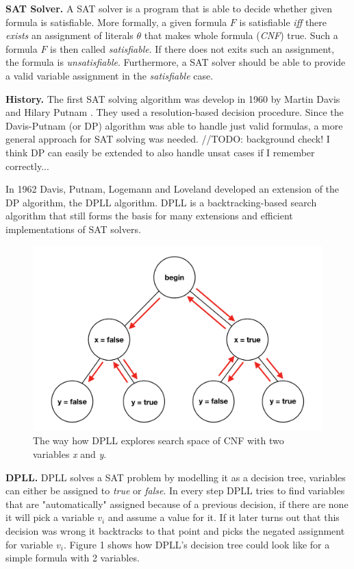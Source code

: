\documentclass[letterpaper]{article}
\newcommand{\mypar}[1]{{\bf #1.}}
\begin{document}

\mypar{SAT Solver}
A SAT solver is a program that is able to decide whether given formula is satisfiable.
More formally, a given formula $F$ is satisfiable \textit{iff} there \textit{exists} an assignment of literals $\theta$ that makes whole formula (\textit{CNF}) true.
Such a formula $F$ is then called \textit{satisfiable}.
If there does not exits such an assignment, the formula is \textit{unsatisfiable}.
Furthermore, a SAT solver should be able to provide a valid variable assignment in the \textit{satisfiable} case.

\mypar{History}
The first SAT solving algorithm was develop in 1960 by Martin Davis and Hilary Putnam \cite{dp}.
They used a resolution-based decision procedure.
Since the Davis-Putnam (or DP) algorithm was able to handle just valid formulas, a more general approach for SAT solving was needed.
//TODO: background check! I think DP can easily be extended to also handle unsat cases if I remember correctly...

In 1962 Davis, Putnam, Logemann and Loveland developed an extension of the DP algorithm, the DPLL algorithm.
DPLL is a backtracking-based search algorithm that still forms the basis for many extensions and efficient implementations of SAT solvers.
\begin{figure}
	\centering
	\includegraphics[width=\columnwidth]{figures/dpll-branching}
	\caption{The way how DPLL explores search space of CNF with two variables \textit{x} and \textit{y}.
		\label{fig:dpll-branching}}
\end{figure}

\mypar{DPLL}
DPLL solves a SAT problem by modelling it as a decision tree, variables can either be assigned to \textit{true} or \textit{false}.
In every step DPLL tries to find variables that are "automatically" assigned because of a previous decision,
if there are none it will pick a variable $v_i$ and assume a value for it.
If it later turns out that this decision was wrong it backtracks to that point and picks the negated assignment for variable $v_i$.
Figure 1 shows how DPLL's decision tree could look like for a simple formula with 2 variables.
\end{document}
